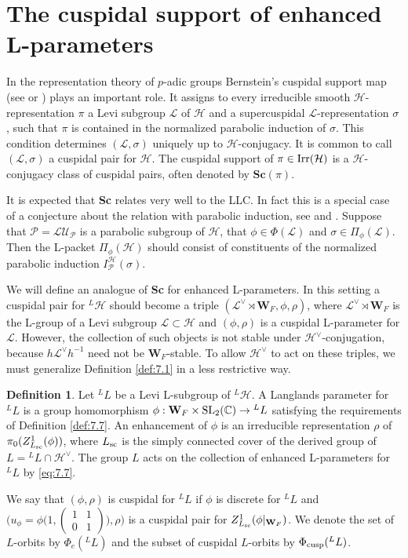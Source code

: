 \documentclass[11pt]{amsart}
\theoremstyle{definition}
\newtheorem{defn}[thm]{Definition}
\newcommand{\mb}{\mathbf}
\newcommand{\mc}{\mathcal}
\newcommand{\C}{\mathbb C}
\newcommand{\matje}[4]{\left(\begin{smallmatrix} #1 & #2 \\ 
#3 & #4 \end{smallmatrix}\right)}
\def\Irr{{\rm Irr}}
\def\SL{{\rm SL}}
\def\cL{{\mathcal L}}
\def\cH{{\mathcal H}}
\def\sc{{\rm sc}}
\def\cusp{{\rm cusp}}
\begin{document}
\section{The cuspidal support of enhanced L-parameters}

In the representation theory of $p$-adic groups Bernstein's cuspidal support map
(see \cite[\S 2]{BeDe} or \cite[VI.7.1]{Ren}) plays an important role. It assigns to 
every irreducible smooth $\cH$-representation $\pi$ a Levi subgroup $\cL$ of $\cH$ 
and a supercuspidal $\cL$-representation $\sigma$, such that $\pi$ is contained in 
the normalized parabolic induction of $\sigma$. This condition 
determines $(\cL,\sigma)$ uniquely up to $\cH$-conjugacy. 
It is common to call $(\cL,\sigma)$ a cuspidal pair for $\cH$. The cuspidal 
support of $\pi \in \Irr (\cH)$ is a $\cH$-conjugacy class of cuspidal pairs,
often denoted by $\mathbf{Sc}(\pi)$.

It is expected that {\bf Sc} relates very well to the LLC. In fact this is a 
special case of a conjecture about the relation with parabolic induction, see
\cite[Conjecture 5.22]{Hai} and \cite[\S 1.5]{ABPS7}. Suppose that $\mc P = 
\cL \mc{U}_{\mc P}$ is a parabolic subgroup of $\cH$, that $\phi \in \Phi (\cL)$
and $\sigma \in \Pi_\phi (\cL)$. Then the L-packet $\Pi_\phi (\cH)$ should consist
of constituents of the normalized parabolic induction $I_{\mc P}^\cH (\sigma)$.

We will define an analogue of {\bf Sc} for enhanced L-parameters.
In this setting a cuspidal pair for ${}^L \cH$ should become a triple
$(\cL^\vee \rtimes \mb W_F , \phi, \rho)$, where $\cL^\vee \rtimes \mb W_F$ is
the L-group of a Levi subgroup $\cL \subset \cH$ and $(\phi,\rho)$ is a cuspidal
L-parameter for $\cL$. However, the collection of such objects is not stable
under $\cH^\vee$-conjugation, because $h \cL^\vee h^{-1}$ need not be 
$\mb W_F$-stable. To allow $\cH^\vee$ to act on these triples,
we must generalize Definition \ref{def:7.1} in a less restrictive way.

\begin{defn}\label{def:7.5}
Let ${}^L L$ be a Levi L-subgroup of ${}^L \cH$. A Langlands parameter for 
${}^L L$ is a group homomorphism $\phi : \mb W_F \times \SL_2 (\C) \to {}^L L$
satisfying the requirements of Definition \ref{def:7.7}. An enhancement of
$\phi$ is an irreducible representation $\rho$ of $\pi_0 (Z^1_{L_{\sc}}(\phi))$, 
where $L_{\sc}$ is the simply connected cover of the derived group of 
$L = {}^L L \cap \cH^\vee$. The group $L$ acts on the collection of enhanced 
L-parameters for ${}^L L$ by \eqref{eq:7.7}. 

We say that $(\phi,\rho)$ is cuspidal for ${}^L L$ if $\phi$ is discrete for 
${}^L L$ and $\big( u_\phi = \phi \big( 1, \matje{1}{1}{0}{1} \big), \rho \big)$ 
is a cuspidal pair for $Z^1_{L_{\sc}}(\phi | _{\mb W_F})$.
We denote the set of $L$-orbits by $\Phi_e ({}^L L)$ and the subset
of cuspidal $L$-orbits by $\Phi_\cusp ({}^L L)$. 
\end{defn}
\end{document}
